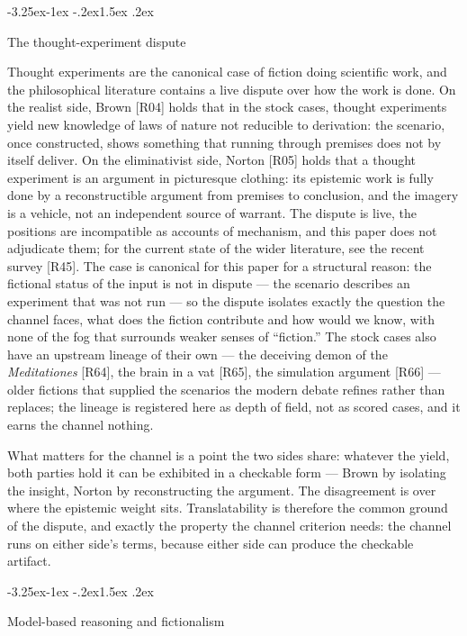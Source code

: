 \documentclass[11pt,a4paper]{article}
\makeatletter
\renewcommand\subsection{\@startsection{subsection}{2}{\z@}%
  {-3.25ex\@plus -1ex \@minus -.2ex}{1.5ex \@plus .2ex}%
  {\normalfont\large\bfseries\raggedright}}
\makeatother
\begin{document}
\subsection{The thought-experiment dispute}

Thought experiments are the canonical case of fiction doing scientific work, and the philosophical literature contains a live dispute over how the work is done. On the realist side, Brown [R04] holds that in the stock cases, thought experiments yield new knowledge of laws of nature not reducible to derivation: the scenario, once constructed, shows something that running through premises does not by itself deliver. On the eliminativist side, Norton [R05] holds that a thought experiment is an argument in picturesque clothing: its epistemic work is fully done by a reconstructible argument from premises to conclusion, and the imagery is a vehicle, not an independent source of warrant. The dispute is live, the positions are incompatible as accounts of mechanism, and this paper does not adjudicate them; for the current state of the wider literature, see the recent survey [R45]. The case is canonical for this paper for a structural reason: the fictional status of the input is not in dispute — the scenario describes an experiment that was not run — so the dispute isolates exactly the question the channel faces, what does the fiction contribute and how would we know, with none of the fog that surrounds weaker senses of ``fiction.'' The stock cases also have an upstream lineage of their own — the deceiving demon of the \textit{Meditationes} [R64], the brain in a vat [R65], the simulation argument [R66] — older fictions that supplied the scenarios the modern debate refines rather than replaces; the lineage is registered here as depth of field, not as scored cases, and it earns the channel nothing.

What matters for the channel is a point the two sides share: whatever the yield, both parties hold it can be exhibited in a checkable form — Brown by isolating the insight, Norton by reconstructing the argument. The disagreement is over where the epistemic weight sits. Translatability is therefore the common ground of the dispute, and exactly the property the channel criterion needs: the channel runs on either side's terms, because either side can produce the checkable artifact.

\subsection{Model-based reasoning and fictionalism}
\end{document}
